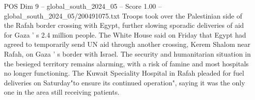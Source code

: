 \begin{textsample}{POS Dim 9 – global\_south\_2024\_05 – Score 1.00 – global\_south\_2024\_05/200491075.txt}
Troops took over the Palestinian side of the Rafah border crossing with Egypt, further slowing sporadic deliveries of aid for Gaza ' s 2.4 million people.
The White House said on Friday that Egypt had agreed to temporarily send UN aid through another crossing, Kerem Shalom near Rafah, on Gaza ' s border with Israel.
The security and humanitarian situation in the besieged territory remains alarming, with a risk of famine and most hospitals no longer functioning.
The Kuwait Speciality Hospital in Rafah pleaded for fuel deliveries on Saturday"to ensure its continued operation", saying it was the only one in the area still receiving patients.

\end{textsample}
